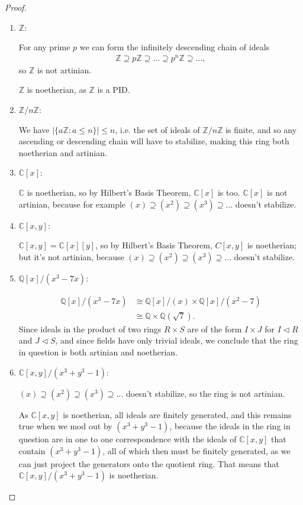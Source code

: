 \documentclass[12pt]{extarticle}
\newcommand{\abs}[1]{|#1|}
\newcommand{\set}[1]{\{#1\}}
\newcommand{\C}{\mathbb{C}}
\newcommand{\Q}{\mathbb{Q}}
\newcommand{\Z}{\mathbb{Z}}
\newcommand{\<}{\langle}
\newcommand{\ideal}{\triangleleft}
\renewcommand{\>}{\rangle}
\theoremstyle{definition}
\begin{document}
\begin{proof}
  \begin{enumerate}
  \item $\Z$:
    
    For any prime $p$ we can form the infinitely descending chain of ideals
    \begin{align*}
      \Z \supseteq p\Z \supseteq \dots \supseteq p^n\Z \supseteq \dots,
    \end{align*}
    so $\Z$ is not artinian.

    $\Z$ is noetherian, as $\Z$ is a PID.
  \item
    $\Z/n\Z$:

    We have $\abs{\set{a\Z: a \leq n}} \leq n$, i.e. the set of ideals of $\Z/n\Z$ is finite, and so any ascending or descending chain will have to stabilize, making this ring both noetherian and artinian. 
  \item
    $\C[x]$:

    $\C$ is noetherian, so by Hilbert's Basis Theorem, $\C[x]$ is too. $\C[x]$ is not artinian, because for example $(x) \supseteq (x^2) \supseteq (x^3) \supseteq \dots $ doesn't stabilize.
  \item
    $\C[x,y]$:

    $\C[x,y] = \C[x][y]$, so by Hilbert's Basis Theorem, $C[x,y]$ is noetherian; but it's not artinian, because $(x) \supseteq (x^2) \supseteq (x^3) \supseteq \dots $ doesn't stabilize.
  \item
    $\Q[x]/(x^3-7x)$:

    \begin{align*}
      \Q[x]/(x^3-7x) &\cong \Q[x]/(x) \times \Q[x]/(x^2-7) \\
      &\cong \Q \times \Q(\sqrt{7}).
    \end{align*}
    Since ideals in the product of two rings $R \times S$ are of the form $I \times J$ for $I \ideal R$ and $J \ideal S$, and since fields have only trivial ideals, we conclude that the ring in question is both artinian and noetherian.

  \item
    $\C[x,y]/(x^3+y^3-1)$:

    $(x) \supseteq (x^2) \supseteq (x^3) \supseteq \dots $ doesn't stabilize, so the ring is not artinian. 
    
    As $\C[x,y]$ is noetherian, all ideals are finitely generated, and this remains true when we mod out by $(x^3 + y^3 - 1)$, because the ideals in the ring in question are in one to one correspondence with the ideals of $\C[x,y]$ that contain $(x^3+y^3-1)$, all of which then must be finitely generated, as we can just project the generators onto the quotient ring. That means that $\C[x,y]/(x^3+y^3-1)$ is noetherian.
    

\end{enumerate}
\end{proof}
\end{document}
